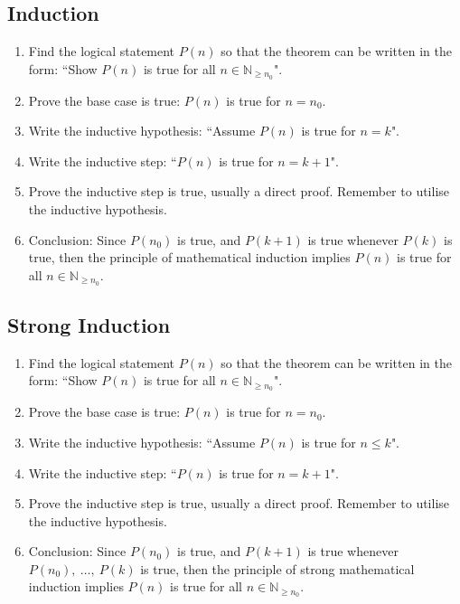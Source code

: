 \documentclass{article}
\newcommand*{\N}{\mathbb{N}}
\theoremstyle{plain}
\numberwithin{theorem}{subsection}
\theoremstyle{definition}
\numberwithin{definition}{subsection}
\theoremstyle{remark}
\numberwithin{note}{subsection}
\begin{document}
\subsection{Induction}
\begin{enumerate}
    \item Find the logical statement $P(n)$ so that the theorem can be written in the form: ``Show $P(n)$ is true for all $n \in \N_{\geqslant n_0}$".
    \item Prove the base case is true: $P(n)$ is true for $n=n_0$.
    \item Write the inductive hypothesis: ``Assume $P(n)$ is true for $n=k$".
    \item Write the inductive step: ``$P(n)$ is true for $n=k+1$".
    \item Prove the inductive step is true, usually a direct proof. Remember to utilise the inductive hypothesis.
    \item Conclusion: Since $P(n_0)$ is true, and $P(k+1)$ is true whenever $P(k)$ is true, then the principle of mathematical induction implies $P(n)$ is true for all $n\in \N_{\geqslant n_0}$.
\end{enumerate}
%
\subsection{Strong Induction}
\begin{enumerate}
    \item Find the logical statement $P(n)$ so that the theorem can be written in the form: ``Show $P(n)$ is true for all $n \in \N_{\geqslant n_0}$".
    \item Prove the base case is true: $P(n)$ is true for $n=n_0$.
    \item Write the inductive hypothesis: ``Assume $P(n)$ is true for $n\leqslant k$".
    \item Write the inductive step: ``$P(n)$ is true for $n=k+1$".
    \item Prove the inductive step is true, usually a direct proof. Remember to utilise the inductive hypothesis.
    \item Conclusion: Since $P(n_0)$ is true, and $P(k+1)$ is true whenever $P(n_0),\: \ldots,\: P(k)$ is true, then the principle of strong mathematical induction implies $P(n)$ is true for all $n\in \N_{\geqslant n_0}$.
\end{enumerate}
%
\end{document}
